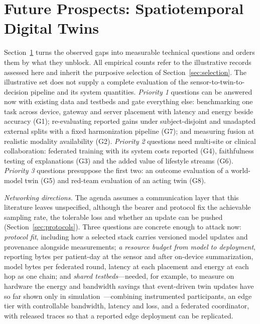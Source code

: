 \documentclass[journal]{IEEEtran}
\begin{document}
\section{Future Prospects: Spatiotemporal Digital Twins}
\label{sec:future}

Section~\ref{sec:future} turns the observed gaps into measurable technical questions and orders them by what they unblock. All empirical counts refer to the illustrative records assessed here and inherit the purposive selection of Section~\ref{sec:selection}. The illustrative set does not supply a complete evaluation of the sensor-to-twin-to-decision pipeline and its system quantities. \emph{Priority 1} questions can be answered now with existing data and testbeds and gate everything else: benchmarking one task across device, gateway and server placement with latency and energy beside accuracy (G1); re-evaluating reported gains under subject-disjoint and unadapted external splits with a fixed harmonization pipeline (G7); and measuring fusion at realistic modality availability (G2). \emph{Priority 2} questions need multi-site or clinical collaboration: federated training with its system costs reported (G4), faithfulness testing of explanations (G3) and the added value of lifestyle streams (G6). \emph{Priority 3} questions presuppose the first two: an outcome evaluation of a world-model twin (G5) and red-team evaluation of an acting twin (G8).

\emph{Networking directions.} The agenda assumes a communication layer that this literature leaves unspecified, although the bearer and protocol fix the achievable sampling rate, the tolerable loss and whether an update can be pushed (Section~\ref{sec:protocols}). Three questions are concrete enough to attack now: \emph{protocol fit}, including how a selected stack carries versioned model updates and provenance alongside measurements; \emph{a resource budget from model to deployment}, reporting bytes per patient-day at the sensor and after on-device summarization, model bytes per federated round, latency at each placement and energy at each hop as one chain; and \emph{shared testbeds}---needed, for example, to measure on hardware the energy and bandwidth savings that event-driven twin updates have so far shown only in simulation~\cite{jun2026aiottwin}---combining instrumented participants, an edge tier with controllable bandwidth, latency and loss, and a federated coordinator, with released traces so that a reported edge deployment can be replicated.
\end{document}
